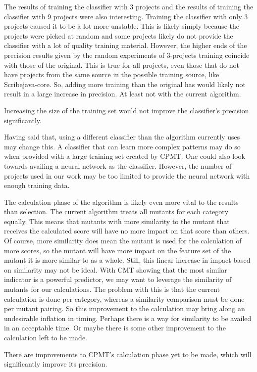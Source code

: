 \documentclass[twoside]{uva-inf-bachelor-thesis}
\begin{document}
The results of training the classifier with 3 projects and the results of training the classifier with 9 projects were also interesting. Training the classifier with only 3 projects caused it to be a lot more unstable. This is likely simply because the projects were picked at random and some projects likely do not provide the classifier with a lot of quality training material. However, the higher ends of the precision results given by the random experiments of 3-projects training coincide with those of the original. This is true for all projects, even those that do not have projects from the same source in the possible training source, like Scribejava-core. So, adding more training than the original has would likely not result in a large increase in precision. At least not with the current algorithm.
\begin{hypothesis}
    Increasing the size of the training set would not improve the classifier's precision significantly.
\end{hypothesis}

Having said that, using a different classifier than the algorithm currently uses may change this. A classifier that can learn more complex patterns may do so when provided with a large training set created by CPMT. One could also look towards availing a neural network as the classifier. However, the number of projects used in our work may be too limited to provide the neural network with enough training data.

The calculation phase of the algorithm is likely even more vital to the results than selection. The current algorithm treats all mutants for each category equally. This means that mutants with more similarity to the mutant that receives the calculated score will have no more impact on that score than others. Of course, more similarity does mean the mutant is used for the calculation of more scores, so the mutant will have more impact on the feature set of the mutant it is more similar to as a whole. Still, this linear increase in impact based on similarity may not be ideal. With CMT showing that the most similar indicator is a powerful predictor, we may want to leverage the similarity of mutants for our calculations. The problem with this is that the current calculation is done per category, whereas a similarity comparison must be done per mutant pairing. So this improvement to the calculation may bring along an undesirable inflation in timing. Perhaps there is a way for similarity to be availed in an acceptable time. Or maybe there is some other improvement to the calculation left to be made.
\begin{hypothesis}
    There are improvements to CPMT's calculation phase yet to be made, which will significantly improve its precision.
\end{hypothesis}
\end{document}

